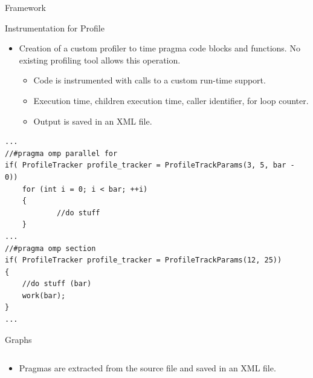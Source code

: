\documentclass[xcolor=dvipsnames]{beamer}
\begin{document}
\begin{section}{Framework}














\begin{frame}[fragile]{\hskip 0.3cm Instrumentation for Profile}

\begin{itemize}
\item Creation of a custom profiler to time pragma code blocks and functions.  No existing profiling tool allows this operation.

\begin{itemize}

\item Code is instrumented with calls to a custom run-time support.

\item Execution time, children execution time, caller identifier, for loop counter.

\item Output is saved in an XML file.

\end{itemize}
\end{itemize}
\begin{lstlisting}[language=CCC]
...
//#pragma omp parallel for
if( ProfileTracker profile_tracker = ProfileTrackParams(3, 5, bar - 0))
	for (int i = 0; i < bar; ++i)
	{
    		//do stuff
	}
...
//#pragma omp section
if( ProfileTracker profile_tracker = ProfileTrackParams(12, 25))
{
    //do stuff (bar)
    work(bar);
}
...
\end{lstlisting}

\end{frame}












\begin{frame}{\hskip 0.3cm Graphs}

\begin{columns}

\begin{column}{5cm}

\begin{itemize}

\item Pragmas are extracted from the source file and saved in an XML file.


\end{itemize}
\end{column}
\end{columns}
\end{frame}
\end{section}
\end{document}

